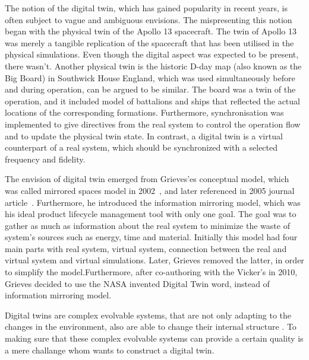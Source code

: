 \documentclass{llncs}
\begin{document}
    The notion of the digital twin, which has gained popularity in 
    recent years, is often subject to vague and ambiguous envisions\cite{Review1}.
    The mispresenting this notion began with the physical twin of the Apollo 13 spacecraft. 
    The twin of Apollo 13 was merely a tangible replication of the spacecraft that has been utilised in the physical simulations. 
    Even though the digital aspect was expected to be present, there wasn't\cite{GrievesApollo13}.
    Another physical twin is the historic D-day map (also known as the Big Board) in Southwick House England, 
    which was used simultaneously before and during operation, can be argued to be similar. 
    The board was a twin of the operation, and it included model of battalions and ships that reflected the actual 
    locations of the corresponding formations. Furthermore, synchronisation was 
    implemented to give directives from the real system to control the operation 
    flow and to update the physical twin state\cite{AMRC}.
    In contrast, a digital twin is a virtual counterpart of a real system, which should 
    be synchronized with a selected frequency and fidelity\cite{Review1}\cite{Review2}\cite{digitaltwinconsortium2022}.
    
    The envision of digital twin emerged from Grieves'es conceptual model, which was called mirrored spaces model in 2002~\cite{Originsofdigitaltwinconcept},
    and later referenced in 2005 journal article~\cite{2005JournayArticle}. 
    Furthermore, he introduced the information mirroring model, which was his ideal product lifecycle management tool with only one goal. 
    The goal was to gather as much as  information about the real system to minimize the waste of system's sources such as energy, 
    time and material. Initially this model had four main parts with real system, 
    virtual system, connection between the real and virtual system and virtual simulations\cite{GrievesPLMBook}. 
    Later, Grieves removed the latter, in order to simplify the model\cite{Originsofdigitaltwinconcept}.Furthermore, after co-authoring with the Vicker's in 2010, 
    Grieves decided to use the NASA invented Digital Twin word, instead of information mirroring model\cite{Originsofdigitaltwinconcept}.


    Digital twins are complex evolvable systems, that are not only adapting to the changes in the environment, 
    also are able to change their internal structure \cite{ZHANGUPDATEMETHOD}\cite{MobusSystemTheory}. 
    To making sure that these complex evolvable systems can provide a certain quality is a mere challange whom wants to construct a digital twin.   
    
\end{document}

